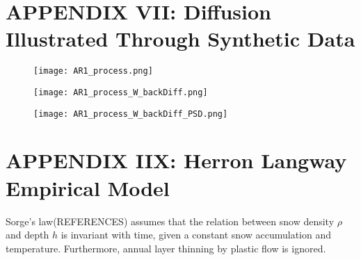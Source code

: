 \documentclass[../../CompleteThesis2/Complete_2ndDraft.tex]{subfiles}
\begin{document}
	
	\newpage
	\section[Appendix VII]{APPENDIX VII: Diffusion Illustrated Through Synthetic Data}
	\label{AppVII:SignalAnalysis_SyntheticData}
	\begin{figure}[h]
		\centering
		\texttt{[image: AR1\_process.png]}
		\caption[]{}
		\label{fig:AR1_process}
	\end{figure}
	
	\begin{figure}[h]
		\centering
		\texttt{[image: AR1\_process\_W\_backDiff.png]}
		\caption[]{}
		\label{fig:AR1_process_W_backDiff}
	\end{figure}
	
	\begin{figure}[h]
		\centering
		\texttt{[image: AR1\_process\_W\_backDiff\_PSD.png]}
		\caption[]{}
		\label{fig:AR1_process_W_backDiff_PSD}
	\end{figure}




	\newpage
	\section[Appendix IIX]{APPENDIX IIX: Herron Langway Empirical Model}
	\label{AppIIX:HLmodel}
	
	
	Sorge's law(REFERENCES) assumes that the relation between snow density $\rho$ and depth $h$ is invariant with time, given a constant snow accumulation and temperature. Furthermore, annual layer thinning by plastic flow is ignored.
	
\end{document}

